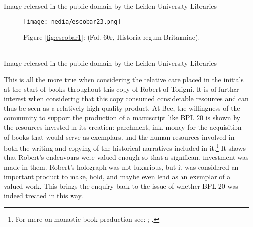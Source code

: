 \documentclass{article}
\begin{document}
 Image released in the public domain by the Leiden University Libraries 

  \hfill
  \begin{figure}
    \texttt{[image: media/escobar23.png]}
    \caption{Figure \ref{fig:escobar1}: (Fol. 60r, Historia regum Britanniae).\\ \\}
    \label{fig:escobar23}
\end{figure}

 Image released in the public domain by the Leiden University Libraries 


This is all the more true when considering the relative care placed in
the initials at the start of books throughout this copy of Robert of
Torigni. It is of further interest when considering that this copy
consumed considerable resources and can thus be seen as a relatively
high-quality product. At Bec, the willingness of the community to
support the production of a manuscript like BPL 20 is shown by the
resources invested in its creation: parchment, ink, money for the
acquisition of books that would serve as exemplars, and the human
resources involved in both the writing and copying of the historical
narratives included in it.\footnote{For more on monastic book production
  see: \cite{thomson_monastic_2008}; \cite{webber_monastic_2008}.} It shows that Robert's
endeavours were valued enough so that a significant investment was made
in them. Robert's holograph was not luxurious, but it was considered an
important product to make, hold, and maybe even lend as an exemplar of a
valued work. This brings the enquiry back to the issue of whether BPL 20
was indeed treated in this way.
\end{document}
